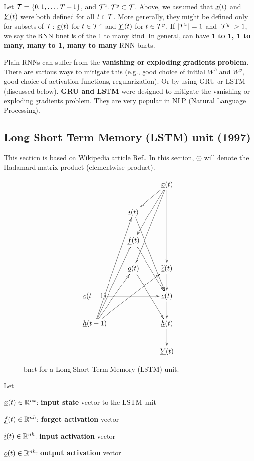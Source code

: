 Let ${\cal T}=\{0,1, \dots , T-1\}$,
and
${\cal T}^x, {\cal T}^y\subset {\cal T}$.
Above, 
we assumed that 
$\rvx(t)$ and $\rvY(t)$
were both defined 
for all $t\in {\cal T}$.
More generally, they 
might be defined only
for subsets of ${\cal T}$:
$\rvx(t)$ for $t\in {\cal T}^x$
and 
$\rvY(t)$ for $t\in {\cal T}^y$.
If $|{\cal T}^x|=1$ and
$|\calt^y|>1$, 
we say the RNN bnet is of
the 1 to many kind.
In general, can have 
{\bf 1 to 1, 1 to many, many to 1, 
many to many} RNN bnets.

Plain RNNs can suffer 
from the
{\bf vanishing or exploding
 gradients problem}.
There are various ways to
mitigate this (e.g., good choice of initial
$W^h$ and $W^y$, 
good choice of activation 
functions, regularization).
Or by using GRU or LSTM (discussed below).
 {\bf GRU and LSTM}
were designed to mitigate the
vanishing or exploding gradients problem.
They are very popular in NLP (Natural
Language Processing).



\newpage

\subsection{Long  
Short Term Memory (LSTM) unit (1997)}

This section
is based on Wikipedia article 
Ref.\cite{lstm}. In this section,
$\odot$
will denote the Hadamard matrix product
(elementwise product).

\begin{figure}[h!]
\centering
$$\xymatrix{
&&\rvx(t)\ar[ddd]\ar[dl]\ar[ldd]\ar[lddd]
\\
&\rvi(t)\ar[rddd]
&\\
&\rvf(t)\ar[rdd]&\\
&\rvo(t)\ar[ddr]
&\TIL{\rvc}(t)\ar[d]
\\
\rvc(t-1)\ar[rr]
&&\rvc(t)\ar[d]
\\
\rvh(t-1)\ar[ruuuu]\ar[ruuu]\ar[ruu]\ar[rruu]
&&\rvh(t)\ar[d]\\
&&\rvY(t)
}$$
\caption{
bnet for a Long Short Term Memory
 (LSTM) unit.}
\label{fig-rnn-lstm}
\end{figure}

Let

$\rvx(t)\in \RR^{nx}$:
{\bf input state} vector to the LSTM unit

$\rvf(t)\in \RR^{nh}$:
{\bf forget activation} vector

$\rvi(t)\in \RR^{nh}$:
{\bf input activation} vector

$\rvo(t)\in \RR^{nh}$:
{\bf output activation} vector

